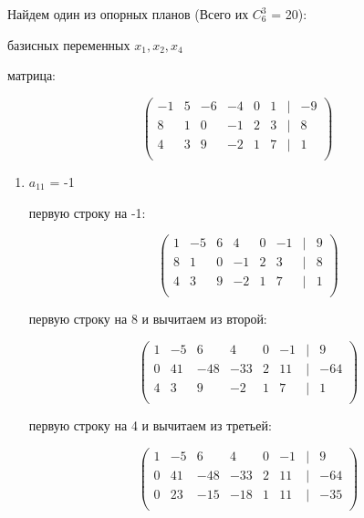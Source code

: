 \documentclass{report}
\begin{document}
	\newpage
	
	Найдем один из опорных планов (Всего их $C_6^3$ = 20):
	
	\begin{itemize}
		 базисных переменных $x_1, x_2, x_4$
		
		 матрица:
		
		\begin{center}
			{
				\[
				\begin{pmatrix}
					-1 & 5 & -6 & -4 & 0 & 1 & | & -9 \\
					8 & 1 & 0 & -1 & 2 & 3 & | & 8 \\
					4 & 3 & 9 & -2 & 1 & 7 & | & 1 \\
				\end{pmatrix}
				\]
			}
		\end{center}
		
		\begin{enumerate}
			\item{$a_{11}$ = -1}
			
			\begin{itemize}
				 первую строку на -1:
				
				\begin{center}
					{
						\[
						\begin{pmatrix}
							1 & -5 & 6 & 4 & 0 & -1 & | & 9 \\
							8 & 1 & 0 & -1 & 2 & 3 & | & 8 \\
							4 & 3 & 9 & -2 & 1 & 7 & | & 1 \\
						\end{pmatrix}
						\]
					}
				\end{center}
				
				 первую строку на 8 и вычитаем из второй:
				
				\begin{center}
					{
						\[
						\begin{pmatrix}
							1 & -5 & 6 & 4 & 0 & -1 & | & 9 \\
							0 & 41 & -48 & -33 & 2 & 11 & | & -64 \\
							4 & 3 & 9 & -2 & 1 & 7 & | & 1 \\
						\end{pmatrix}
						\]
					}
				\end{center}
				
				 первую строку на 4 и вычитаем из третьей:
				
				\begin{center}
					{
						\[
						\begin{pmatrix}
							1 & -5 & 6 & 4 & 0 & -1 & | & 9 \\
							0 & 41 & -48 & -33 & 2 & 11 & | & -64 \\
							0 & 23 & -15 & -18 & 1 & 11 & | & -35 \\
						\end{pmatrix}
						\]
					}
				\end{center}
				

\end{itemize}
\end{enumerate}
\end{itemize}
\end{document}
